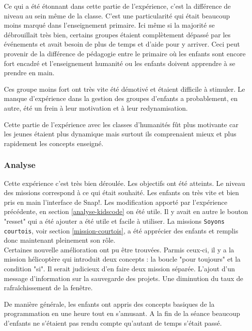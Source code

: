Ce qui a été étonnant dans cette partie de l'expérience, c'est la différence de niveau au sein même de la classe. C'est une particularité qui était beaucoup moins marqué dans l'enseignement primaire. Ici même si la majorité se débrouillait très bien, certains groupes étaient complètement dépassé par les événements et avait besoin de plus de temps et d'aide pour y arriver. Ceci peut provenir de la différence de pédagogie entre le primaire où les enfants sont encore fort encadré et l'enseignement humanité ou les enfants doivent apprendre à se prendre en main.

Ces groupe moins fort ont très vite été démotivé et étaient difficile à stimuler. Le manque d'expérience dans la gestion des groupes d'enfants a probablement, en autre, été un frein à leur motivation et à leur redynamisation.

Cette partie de l'expérience avec les classes d'humanités fût plus motivante car les jeunes étaient plus dynamique mais surtout ils comprenaient mieux et plus rapidement les concepts enseigné.

\subsubsection{Analyse}
Cette expérience c'est très bien déroulée. Les objectifs ont été atteints. Le niveau des missions correspond à ce qui était souhaité. Les enfants on très vite et bien pris en main l'interface de Snap!. Les modification apporté par l'expérience précédente, en section \ref{analyse-kidscode} on été utile. Il y avait en autre le bouton "resset" qui a été ajouter a été utile et facile à utiliser. La missions \texttt{Soyons courtois}, voir section \ref{mission-courtois}, a été apprécier des enfants et remplis donc maintenant pleinement son rôle.\\

Certaines nouvelle amélioration ont pu être trouvées. Parmis ceux-ci, il y a la mission hélicoptère qui introduit deux concepts : la boucle "pour toujours" et la condition "si". Il serait judicieux d'en faire deux mission séparée. L'ajout d'un message d'information sur la sauvegarde des projets. Une diminution du taux de rafraîchissement de la fenêtre.

De manière générale, les enfants ont appris des concepts basiques de la programmation en une heure tout en s'amusant. A la fin de la séance beaucoup d'enfants ne s'étaient pas rendu compte qu'autant de temps s'était passé.
